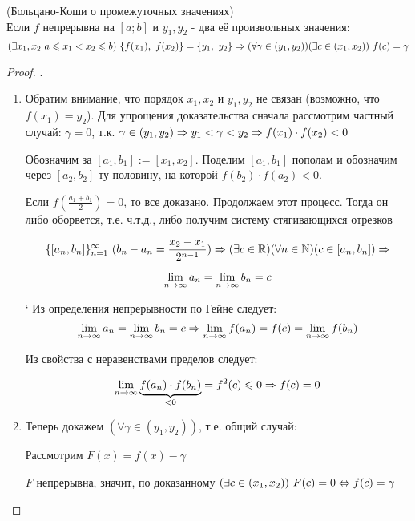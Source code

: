 \begin{theorem} (Больцано-Коши о промежуточных значениях) \\
	Если $f$ непрерывна на $[a; b]$ и $y_1, y_2$ - два её
	произвольных значения:
	\[
	(\exists x_1, x_2\ a \leqslant x_1 < x_2 \leqslant b)\ \{f(x_1),\ f(x_2)
	\} = \{y_1,\ y_2\} \Rightarrow (\forall \gamma \in (y_1, y_2))
	(\exists c \in (x_1, x_2))\ f(c) = \gamma
	\]
\end{theorem}

\begin{proof}.

\begin{enumerate}
	\item 
	Обратим внимание, что порядок $x_1, x_2$ и $y_1, y_2$ не связан
	(возможно, что $f(x_1) = y_2$).
	Для упрощения доказательства сначала рассмотрим частный случай:
	$\gamma = 0$, т.к. $\gamma \in (y_1, y_2) \Rightarrow y_1 < \gamma
	< y_2 \Rightarrow f(x_1) \cdot f(x_2) < 0$

	Обозначим за $[a_1, b_1] := [x_1, x_2]$. Поделим $[a_1, b_1]$
	пополам и обозначим через $[a_2, b_2]$ ту половину, на которой
	$f(b_2) \cdot f(a_2) < 0$. 
	
	Если $f\left(\frac{a_1 + b_1}{2}\right)
	= 0$, то все доказано. Продолжаем этот процесс. Тогда он либо
	оборвется, т.е. ч.т.д., либо получим систему стягивающихся
	отрезков

	\[
	\{[a_n, b_n]\}_{n = 1}^{\infty}\ 
	(b_n - a_n = \frac{x_2 - x_1}{2^{n - 1}})
	\Ra (\exists c \in \R)(\forall n \in \N)(c \in [a_n, b_n])
	\Ra 
	\]

	\[
	\lim\limits_{n \to \infty} a_n = \lim\limits_{n \to \infty} b_n
	= c
	\]

`	Из определения непрерывности по Гейне следует:
	\[
	\lim\limits_{n \to \infty} a_n = \lim\limits_{n \to \infty} b_n
	= c \Rightarrow \lim\limits_{n \to \infty} f(a_n) = f(c) =
	\lim\limits_{n \to \infty} f(b_n) 
	\]

	Из свойства с неравенствами пределов следует:

	\[
	\lim\limits_{n \to \infty} \underbrace{f(a_n) \cdot f(b_n)}_{< 0}
	= f^2 (c) \leqslant 0 \Rightarrow f(c) = 0
	\]
	
	\item
	Теперь докажем $(\forall \gamma \in (y_1, y_2))$, т.е. общий случай:

	Рассмотрим $F(x) = f(x) - \gamma$
	
	$F$ непрерывна, значит,
	по доказанному $(\exists c \in (x_1, x_2))\ F(c) = 0 \Leftrightarrow
	f(c) = \gamma$
\end{enumerate}
\end{proof}

